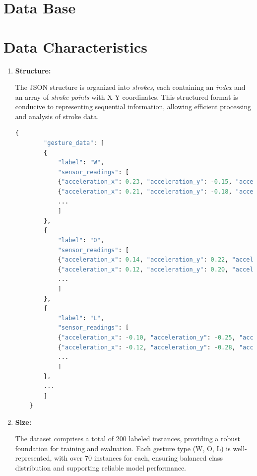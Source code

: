 %
%
\section{Data Base}


\section{Data Characteristics}

\begin{enumerate}
	\item \textbf{Structure:}
	
	The JSON structure is organized into \textit{strokes}, each containing an \textit{index} and an array of \textit{stroke points} with X-Y coordinates. This structured format is conducive to representing sequential information, allowing efficient processing and analysis of stroke data.
	
\begin{lstlisting}[language=Python, caption={Example of gesture data with sensor readings}, label={code:gesture-data-json}, style=pythonstyle]
	{
		"gesture_data": [
		{
			"label": "W",
			"sensor_readings": [
			{"acceleration_x": 0.23, "acceleration_y": -0.15, "acceleration_z": 0.98, ...},
			{"acceleration_x": 0.21, "acceleration_y": -0.18, "acceleration_z": 0.95, ...},
			...
			]
		},
		{
			"label": "O",
			"sensor_readings": [
			{"acceleration_x": 0.14, "acceleration_y": 0.22, "acceleration_z": 0.93, ...},
			{"acceleration_x": 0.12, "acceleration_y": 0.20, "acceleration_z": 0.91, ...},
			...
			]
		},
		{
			"label": "L",
			"sensor_readings": [
			{"acceleration_x": -0.10, "acceleration_y": -0.25, "acceleration_z": 0.88, ...},
			{"acceleration_x": -0.12, "acceleration_y": -0.28, "acceleration_z": 0.85, ...},
			...
			]
		},
		...
		]
	}
\end{lstlisting}

	
	
	\item \textbf{Size:}
	
	The dataset comprises a total of 200 labeled instances, providing a robust foundation for training and evaluation. Each gesture type (W, O, L) is well-represented, with over 70 instances for each, ensuring balanced class distribution and supporting reliable model performance.
	

\end{enumerate}
